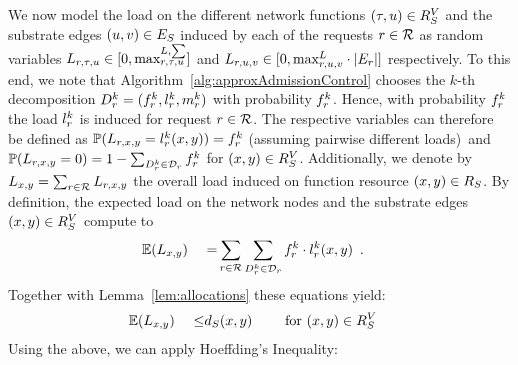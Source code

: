 \documentclass[10pt, conference, letterpaper]{IEEEtran}
\begin{document}
We now model the load on the different network functions $(\tau,u) \in  R^V_{S}$ and the substrate edges $(u,v) \in  E_S$ induced by each of the requests $r \in \mathcal{R}$ as random variables $L_{\req,\type,u} \in [0,\maxLoadVSum]$ and $L_{\req,u,v} \in [0,\maxLoadE \cdot |\VE|]$ respectively. To this end, we note that Algorithm~\ref{alg:approxAdmissionControl} chooses the $k$-th decomposition $\decomp = (\prob, \load,\mapping)$ with probability $\prob$. Hence, with probability $\prob$ the load $\load$ is induced for request $r \in \mathcal{R}$. The respective variables can therefore be defined as $
\mathbb{P}(L_{\req,x,y} = \load(x,y))= \prob $ (assuming pairwise different loads)~and $\mathbb{P}(L_{\req,x,y} = 0)=  1 - \sum_{\decomp \in \PotEmbeddings } \prob $ for $(x,y) \in  R^V_{S}$.
Additionally, we denote by $L_{x,y} = \sum_{r \in \mathcal{R}} L_{r,x,y}$ the overall load induced on function resource $(x,y) \in  R_{S}$.
By definition, the expected load on the network nodes and the substrate edges $(x,y) \in  R^V_{S}$ compute to
\begin{alignat}{3}
\mathbb{E}(L_{x,y})~&& = & \sum_{\req \in \requests} \sum_{\decomp \in \PotEmbeddings} \prob \cdot \load(x,y)~ \,.
\end{alignat}
Together with Lemma~\ref{lem:allocations} these equations yield:
\begin{alignat}{5}
\mathbb{E}(L_{x,y})~&& \leq & d_{S}(x,y)~& \quad & \textnormal{for}~ (x,y) \in  R^V_{S} \label{eq:load-vs-capacity}
\end{alignat}
Using the above, we can apply Hoeffding's Inequality:
\end{document}
